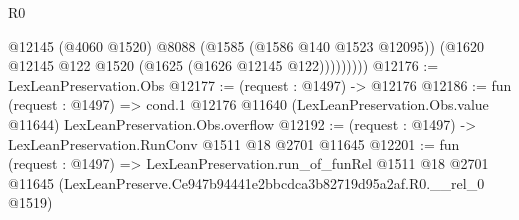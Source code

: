 \begin{lexlean}{R0}
\begin{coremodule}
                @12145
                (@4060 @1520)
                @8088
                (@1585 (@1586 @140 @1523 @12095))
                (@1620 @12145 @122 @1520 (@1625 (@1626 @12145 @122)))))))))
@12176 := LexLeanPreservation.Obs
@12177 := (request : @1497) -> @12176
@12186 := fun (request : @1497) =>
  cond.{1} @12176 @11640 (LexLeanPreservation.Obs.value @11644) LexLeanPreservation.Obs.overflow
@12192 := (request : @1497) -> LexLeanPreservation.RunConv @1511 @18 @2701 @11645
@12201 := fun (request : @1497) =>
  LexLeanPreservation.run_of_funRel
    @1511
    @18
    @2701
    @11645
    (LexLeanPreserve.Ce947b94441e2bbcdca3b82719d95a2af.R0.__rel_0 @1519)
\end{coremodule}
\end{lexlean}
